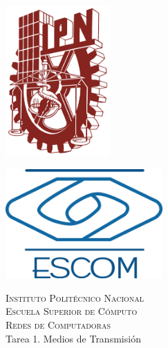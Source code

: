 \begin{titlepage}
	\begin{center}
		
		\noindent
		\begin{minipage}{0.5\textwidth}
			\begin{flushleft} \large
				\includegraphics[width=0.3\textwidth]{../../Images/ipn.png}
			\end{flushleft}
		\end{minipage}%
		\begin{minipage}{0.55\textwidth}
			\begin{flushright} \large
				\includegraphics[width=0.45\textwidth]{../../Images/logoescom.png}
			\end{flushright}
		\end{minipage}
		
		\textsc{\LARGE Instituto Politécnico Nacional}\\[0.5cm]
		
		\textsc{\Large Escuela Superior de Cómputo}\\[1cm]
		
		\textsc{\Large Redes de Computadoras}\\[1cm]
		
		
		{ \huge Tarea 1. Medios de Transmisión\\[1cm] }
		

\end{center}
\end{titlepage}
